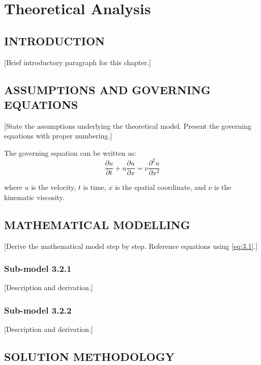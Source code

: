 \chapter{Theoretical Analysis}

\section{INTRODUCTION}

[Brief introductory paragraph for this chapter.]

\section{ASSUMPTIONS AND GOVERNING EQUATIONS}

[State the assumptions underlying the theoretical model.
Present the governing equations with proper numbering.]

The governing equation can be written as:
\begin{equation}
    \label{eq:3.1}
    \frac{\partial u}{\partial t} + u \frac{\partial u}{\partial x}
    = \nu \frac{\partial^2 u}{\partial x^2}
\end{equation}

where $u$ is the velocity, $t$ is time, $x$ is the spatial
coordinate, and $\nu$ is the kinematic viscosity.

\section{MATHEMATICAL MODELLING}

[Derive the mathematical model step by step. Reference
equations using \eqref{eq:3.1}.]

\subsection{Sub-model 3.2.1}

[Description and derivation.]

\subsection{Sub-model 3.2.2}

[Description and derivation.]

\section{SOLUTION METHODOLOGY}

